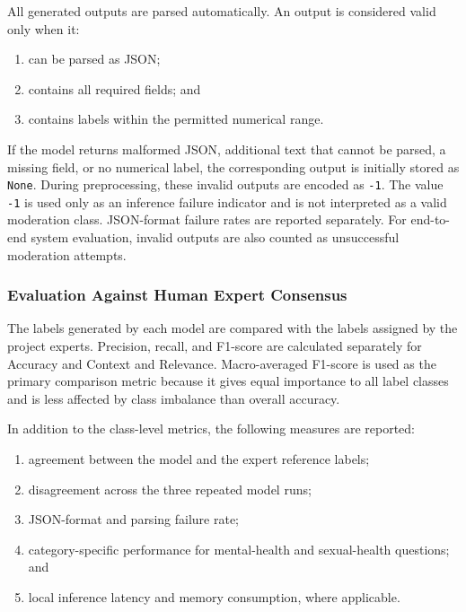 \documentclass[11pt,a4paper]{article}
\begin{document}
All generated outputs are parsed automatically. An output is considered valid
only when it:

\begin{enumerate}[nosep]
    \item can be parsed as JSON;
    \item contains all required fields; and
    \item contains labels within the permitted numerical range.
\end{enumerate}

If the model returns malformed JSON, additional text that cannot be parsed, a
missing field, or no numerical label, the corresponding output is initially
stored as \texttt{None}. During preprocessing, these invalid outputs are
encoded as \texttt{-1}. The value \texttt{-1} is used only as an inference
failure indicator and is not interpreted as a valid moderation class.
JSON-format failure rates are reported separately. For end-to-end system
evaluation, invalid outputs are also counted as unsuccessful moderation
attempts.

\subsubsection{Evaluation Against Human Expert Consensus}

The labels generated by each model are compared with the labels assigned by
the project experts. Precision, recall, and F1-score are calculated separately
for Accuracy and Context and Relevance. Macro-averaged F1-score is used as the
primary comparison metric because it gives equal importance to all label
classes and is less affected by class imbalance than overall accuracy.

In addition to the class-level metrics, the following measures are reported:

\begin{enumerate}[nosep]
    \item agreement between the model and the expert reference labels;
    \item disagreement across the three repeated model runs;
    \item JSON-format and parsing failure rate;
    \item category-specific performance for mental-health and sexual-health
    questions; and
    \item local inference latency and memory consumption, where applicable.
\end{enumerate}
\end{document}
